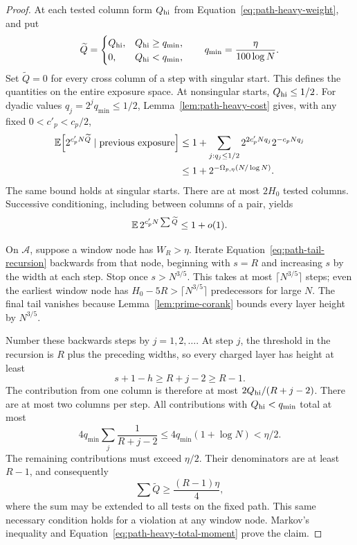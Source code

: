 \begin{proof}
At each tested column form \(Q_{\rm hi}\) from
Equation~\eqref{eq:path-heavy-weight}, and put
\[
 \widetilde Q=
 \begin{cases}
 Q_{\rm hi},&Q_{\rm hi}\ge q_{\min},\\
 0,&Q_{\rm hi}<q_{\min},
 \end{cases}
 \qquad q_{\min}=\frac{\eta}{100\log N}.
\]
Set \(\widetilde Q=0\) for every cross column of a step with singular
start. This defines the quantities on the entire exposure space.
At nonsingular starts, \(Q_{\rm hi}\le1/2\). For dyadic values
\(q_j=2^jq_{\min}\le1/2\), Lemma~\ref{lem:path-heavy-cost} gives,
with any fixed \(0<c'_p<c_p/2\),
\begin{align}
 \mathbb E\!\left[2^{c'_pN\widetilde Q}\mid\text{previous exposure}\right]
 &\le 1+\sum_{j:q_j\le1/2}2^{2c'_pNq_j}2^{-c_pNq_j}\notag\\
 &\le1+2^{-\Omega_{p,\eta}(N/\log N)}.
 \label{eq:path-heavy-one-moment}
\end{align}
The same bound holds at singular starts. There are at most \(2H_0\)
tested columns. Successive conditioning, including between columns of
a pair, yields
\begin{equation}\label{eq:path-heavy-total-moment}
 \mathbb E\,2^{c'_pN\sum\widetilde Q}\le1+o(1).
\end{equation}

On \(\mathcal A\), suppose a window node has \(W_R>\eta\).
Iterate Equation~\eqref{eq:path-tail-recursion} backwards from that
node, beginning with \(s=R\) and increasing \(s\) by the width at
each step. Stop once \(s>N^{3/5}\). This takes at most
\(\lceil N^{3/5}\rceil\) steps; even the earliest window node has
\(H_0-5R>\lceil N^{3/5}\rceil\) predecessors for large \(N\).
The final tail vanishes because Lemma~\ref{lem:prime-corank} bounds
every layer height by \(N^{3/5}\).

Number these backwards steps by \(j=1,2,\ldots\). At step \(j\),
the threshold in the recursion is \(R\) plus the preceding widths,
so every charged layer has height at least
\[
 s+1-h\ge R+j-2\ge R-1.
\]
The contribution from one column is therefore at most
\(2Q_{\rm hi}/(R+j-2)\). There are at most two columns per step.
All contributions with \(Q_{\rm hi}<q_{\min}\) total at most
\[
 4q_{\min}\sum_j\frac1{R+j-2}
       \le4q_{\min}(1+\log N)<\eta/2.
\]
The remaining contributions must exceed \(\eta/2\). Their
denominators are at least \(R-1\), and consequently
\begin{equation}\label{eq:path-heavy-forced-sum}
 \sum\widetilde Q\ge\frac{(R-1)\eta}{4},
\end{equation}
where the sum may be extended to all tests on the fixed path.
This same necessary condition holds for a violation at any window
node. Markov's inequality and
Equation~\eqref{eq:path-heavy-total-moment} prove the claim.
\end{proof}

